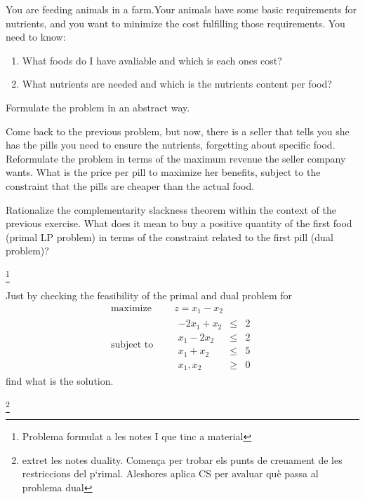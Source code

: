  \begin{Exercise}
    You are feeding animals in a farm.Your animals have some basic requirements for nutrients, and you want to minimize the cost fulfilling those requirements. You need to know:
    \begin{enumerate}
      \item What foods do I have avaliable and which is each ones cost?
      \item What nutrients are needed and which is the nutrients content per food?
    \end{enumerate}
    Formulate the problem in an abstract way.
  \end{Exercise}
  \begin{Exercise}
    Come back to the previous problem, but now, there is a seller that tells you she has the pills you need to ensure the nutrients, forgetting about specific food. Reformulate the problem in terms of the maximum revenue the seller company wants. What is the price per pill to maximize her benefits, subject to the constraint that the pills are cheaper than the actual food.
  \end{Exercise}
  \begin{Exercise}
    Rationalize the complementarity slackness theorem within the context of the previous exercise. What does it mean to buy a positive quantity of the first food (primal LP problem) in terms of the constraint related to the first pill (dual problem)?
  \end{Exercise}
  \footnote{Problema formulat a les notes I que tinc a material}
  \begin{Exercise}
    Just by checking the feasibility of the primal and dual problem for
    \begin{equation*}
      \begin{aligned}
        \text{maximize } \quad & z = x_1-x_2 \\
        \text{subject to }\quad &
        \begin{array}{rcl}
          -2x_1 +x_2 &\leq &2 \\
          x_1-2x_2 &\leq &2 \\
          x_1+x_2 &\leq &5 \\
          x_1,x_2 &\geq& 0
        \end{array}
      \end{aligned}
    \end{equation*}
    find what is the solution.
  \end{Exercise}

\footnote{extret les notes duality. Comença per trobar els punts de creuament de les restriccions del p`rimal. Aleshores aplica CS per avaluar què passa al problema dual}



